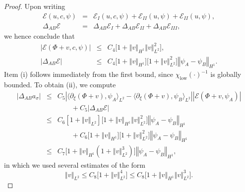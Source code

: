 \documentclass[10pt]{articleHJ}
\newcommand{\abs}[1]{\left\vert#1\right\vert}			%
\newcommand{\norm}[1]{\left\Vert#1\right\Vert}		%
\numberwithin{equation}{section}
\begin{document}
\begin{proof}
Upon
writing
\begin{equation}
\begin{array}{lcl}
\mathcal{E}(u, c, \psi)
 & = &
 \mathcal{E}_{I}(u, c, \psi)
 +\mathcal{E}_{II}(u,  \psi)
 +\mathcal{E}_{II}(u,  \psi) ,
\\[0.2cm]
%
\Delta_{AB} \mathcal{E}
& = &
\Delta_{AB} \mathcal{E}_{I}
+ \Delta_{AB} \mathcal{E}_{II}
+ \Delta_{AB} \mathcal{E}_{III},
\end{array}
\end{equation}
we hence conclude that
\begin{equation}
\begin{array}{lcl}
\abs{\mathcal{E}(\Phi +v, c , \psi) }
& \le & C_4 \big[
1 + \norm{v}_{H^1} \norm{v}_{L^2}^2
\big] ,
\\[0.2cm]
%
\abs{\Delta_{AB} \mathcal{E}}
& \le &
C_4
\big[
1 + \norm{v}_{H^1} \big]
\big[ 1 + \norm{v}_{L^2}^2 \big]
\norm{\psi_A - \psi_B}_{H^1} .
\end{array}
\end{equation}
Item (i) follows
immediately from the first bound,
since $\chi_{\mathrm{low}}(\cdot)^{-1}$
is globally bounded.
To obtain (ii),
we compute
\begin{equation}
\begin{array}{lcl}
 \abs{\Delta_{AB} a_{\sigma}}
 & \le &
   C_5 \abs{ \langle \partial_\xi (\Phi + v) , \psi_A \rangle_{L^2}
     - \langle \partial_\xi (\Phi + v) , \psi_B \rangle_{L^2} }
     \abs{\mathcal{E}(\Phi + v, \psi_A) }
\\[0.2cm]
& & \qquad
 +  C_5 \abs{\Delta_{AB} \mathcal{E} }
\\[0.2cm]
& \le &
  C_6 [1 + \norm{v}_{L^2} ]
   \big[
1 + \norm{v}_{H^1} \norm{v}_{L^2}^2
\big] \norm{\psi_A - \psi_B}_{H^1}
\\[0.2cm]
& & \qquad
  + C_6 \big[
1 + \norm{v}_{H^1} \big]
\big[ 1 + \norm{v}_{L^2}^2 \big]
\norm{\psi_A - \psi_B}_{H^1}
\\[0.2cm]
& \le &
C_7 \Big[ 1 +  \norm{v}_{H^1} (1 + \norm{v}_{L^2}^3) \Big]
  \norm{\psi_A -\psi_B}_{H^1},
\end{array}
\end{equation}
in which we used several estimates of the form
\begin{equation}
\norm{v}_{L^2} \le C_8 \big[ 1 + \norm{v}_{L^2}^4 \big]
\le C_8 \big[ 1 + \norm{v}_{H^1} \norm{v}_{L^2}^3 \big].
\end{equation}
\end{proof}
\end{document}
